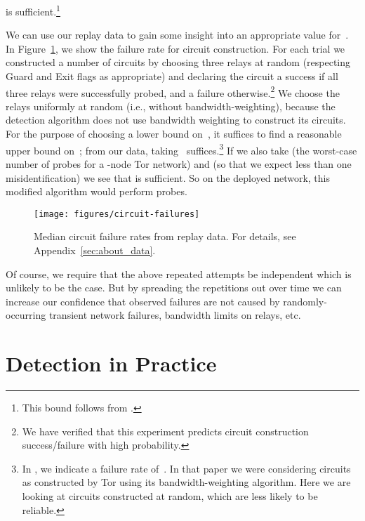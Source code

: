\documentclass[]{lmcs}
\begin{document}
is sufficient.\footnote{This bound follows from .}

We can use our replay data to gain some insight into an appropriate
value for~.  In Figure~\ref{fig:circuit-failures}, we show the
failure rate for circuit construction.  For each trial we constructed
a number of circuits by choosing three relays at random (respecting
Guard and Exit flags as appropriate) and declaring the circuit a
success if all three relays were successfully probed, and a failure
otherwise.\footnote{We have verified that this experiment predicts
circuit construction success/failure with high probability.}
We choose the relays uniformly at random (i.e., without
bandwidth-weighting), because the detection algorithm does not use
bandwidth weighting to construct its circuits.
For the purpose of choosing a lower bound
on~, it suffices to find a reasonable upper bound on~; from
our data, taking~ suffices.\footnote{In
\cite{ddos-fc09}, we indicate a failure rate of~.  In that paper
we were considering circuits as constructed by Tor using its bandwidth-weighting
algorithm.  Here we are looking at circuits constructed at random, which
are less likely to be reliable.}
If we also take
 (the worst-case number of probes for a -node Tor network)
and  (so that we
expect less than one misidentification) we see that  is sufficient.
So on the deployed network, this modified algorithm would perform
 probes.
\begin{figure}
\begin{center}
\texttt{[image: figures/circuit-failures]}
\end{center}
\caption{Median circuit failure rates from replay data.  For
details, see Appendix~\ref{sec:about_data}.}
\label{fig:circuit-failures}
\end{figure}
Of course, we require that the above repeated attempts be independent
which is unlikely to be the case. But by spreading the repetitions out
over time we can increase our confidence that 
observed failures are not caused by randomly-occurring transient network 
failures, bandwidth limits on relays, etc. 


\section{Detection in Practice}
\label{sec:implementation}
\end{document}
